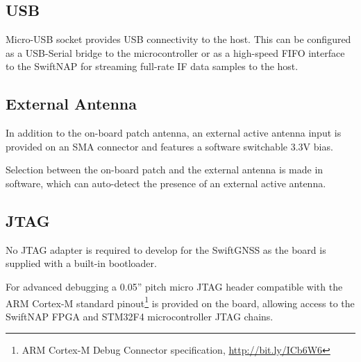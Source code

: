 \documentclass{article}
\begin{document}
\begin{multicols*}{2}
\raggedcolumns

\subsection*{USB}

Micro-USB socket provides USB connectivity to the host. This can be configured
as a USB-Serial bridge to the microcontroller or as a high-speed FIFO
interface to the SwiftNAP for streaming full-rate IF data samples to the host.

\subsection*{External Antenna}

In addition to the on-board patch antenna, an external active antenna input is
provided on an SMA connector and features a software switchable 3.3V bias.

Selection between the on-board patch and the external antenna is made in
software, which can auto-detect the presence of an external active antenna.

\subsection*{JTAG}

No JTAG adapter is required to develop for the SwiftGNSS as the board is
supplied with a built-in bootloader.

For advanced debugging a 0.05'' pitch micro JTAG header compatible with the
ARM Cortex-M standard pinout\footnote{ARM Cortex-M Debug Connector
specification, \url{http://bit.ly/ICb6W6}} is provided on the board, allowing
access to the SwiftNAP FPGA and STM32F4 microcontroller JTAG chains.

\vspace{0.5cm}
\begin{center}
\end{center}


\end{multicols*}
\end{document}
